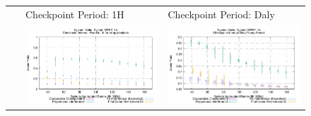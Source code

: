 \documentclass[conference]{IEEEtran}
\begin{document}
\begin{figure}[t]
\noindent\begin{tabular}{C{.02\linewidth}C{.49\linewidth}C{.49\linewidth}}
     ~    &  Checkpoint Period: 1H & Checkpoint Period: Daly \\
 & \includegraphics[width=\linewidth]{sim/figures/1hMTBF-1hckpt-waste-celio.pdf} & \includegraphics[width=\linewidth]{sim/figures/1hMTBF-dalyckpt-waste-celio.pdf} \\

\end{tabular}
\end{figure}
\end{document}
